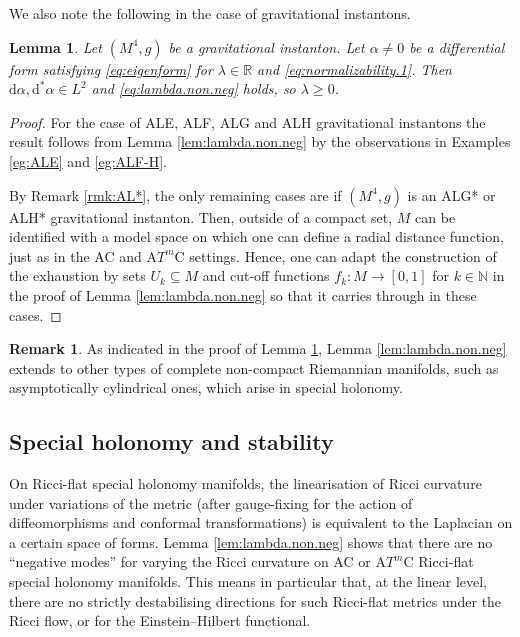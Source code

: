 \documentclass{article}
\newtheorem{lem}[thm]{Lemma}
\theoremstyle{definition}
\newtheorem{rmk}[thm]{Remark}
\numberwithin{thm}{section}
\numberwithin{equation}{section}
\def\R{\mathbb{R}}
\def\N{\mathbb{N}}
\def\d{\mathrm{d}}
\begin{document}
We also note the following in the case of gravitational instantons.

\begin{lem}\label{lem:integrability.grav.inst}  Let $(M^4,g)$ be a gravitational instanton.  
   Let $\alpha\neq 0$ be a differential form satisfying \eqref{eq:eigenform} for $\lambda\in\R$ and \eqref{eq:normalizability.1}.  Then $\d\alpha,\d^*\alpha\in L^2$ and \eqref{eq:lambda.non.neg} holds, so $\lambda\geq 0$.
\end{lem}

\begin{proof} For the case of ALE, ALF, ALG and ALH gravitational instantons the result follows from Lemma \ref{lem:lambda.non.neg} by the observations in Examples \ref{eg:ALE} and \ref{eg:ALF-H}.

By Remark \ref{rmk:AL*}, the only remaining cases are if $(M^4,g)$ is an ALG* or ALH* gravitational instanton. Then, outside of a compact set, $M$ can be identified with a model space on which one can define a radial distance function, just as in the AC and A$T^m$C settings.  Hence, one can adapt  the construction of the exhaustion by sets $U_k\subseteq M$ and cut-off functions $f_k:M\to [0,1]$ for $k\in\N$ in the proof of Lemma \ref{lem:lambda.non.neg} so that it carries through in these cases.
\end{proof}

\begin{rmk}
As indicated in the proof of Lemma \ref{lem:integrability.grav.inst}, Lemma \ref{lem:lambda.non.neg} extends to other types of complete non-compact Riemannian manifolds, such as asymptotically cylindrical ones, which arise in special holonomy. 
\end{rmk}

\subsection{Special holonomy and stability}

On Ricci-flat special holonomy manifolds, the linearisation of Ricci curvature under variations of the metric (after gauge-fixing for the action of diffeomorphisms and conformal transformations) is equivalent to the Laplacian on a certain space of forms.  Lemma \ref{lem:lambda.non.neg} shows that there are no ``negative modes'' for varying the Ricci curvature on AC or A$T^m$C Ricci-flat special holonomy manifolds. This means in particular that, at the linear level, there are no strictly destabilising directions for such Ricci-flat metrics under the Ricci flow, or for the Einstein--Hilbert functional.  
\end{document}
